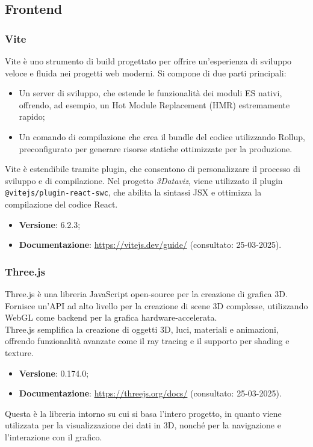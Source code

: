 \subsection{Frontend}
\subsubsection{Vite}
Vite è uno strumento di build progettato per offrire un'esperienza di sviluppo
veloce e fluida nei progetti web moderni. Si compone di due parti principali:
\begin{itemize}
    \item Un server di sviluppo, che estende le funzionalità dei moduli ES nativi,
          offrendo, ad esempio, un Hot Module Replacement (HMR) estremamente rapido;
    \item Un comando di compilazione che crea il bundle del codice utilizzando Rollup,
          preconfigurato per generare risorse statiche ottimizzate per la produzione.
\end{itemize}
Vite è estendibile tramite plugin, che consentono di personalizzare
il processo di sviluppo e di compilazione. Nel progetto \textit{3Dataviz}, viene utilizzato il
plugin \texttt{@vitejs/plugin-react-swc}, che abilita la sintassi JSX e ottimizza la compilazione del codice React.

\begin{itemize}
    \item \textbf{Versione}: 6.2.3;
    \item \textbf{Documentazione}: \url{https://vitejs.dev/guide/} (consultato:
          25-03-2025).
\end{itemize}

\subsubsection{Three.js}
Three.js è una libreria JavaScript open-source per la creazione di grafica 3D.
Fornisce un'API ad alto livello per la creazione di scene 3D complesse,
utilizzando WebGL come backend per la grafica hardware-accelerata. \\Three.js
semplifica la creazione di oggetti 3D, luci, materiali e animazioni, offrendo
funzionalità avanzate come il ray tracing e il supporto per shading e texture.
\begin{itemize}
    \item \textbf{Versione}: 0.174.0;
    \item \textbf{Documentazione}: \url{https://threejs.org/docs/} (consultato:
          25-03-2025).
\end{itemize}
Questa è la libreria intorno su cui si basa l'intero progetto, in quanto
viene utilizzata per la visualizzazione dei dati in 3D, nonché per la
navigazione e l'interazione con il grafico.

